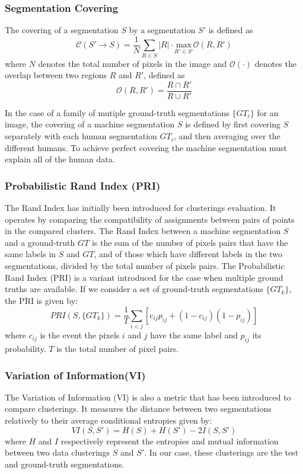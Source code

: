 \subsubsection{Segmentation Covering}

The covering of a segmentation $S$ by a segmentation $S'$ is defined as 
\begin{equation}
	\mathcal{C}(S' \rightarrow S) = \frac{1}{N}\sum_{R \in S} |R| \cdot \underset{R' \in S'}{\mathrm{max}} \mathcal{O}(R, R')
\end{equation}
where $N$ denotes the total number of pixels in the image and $\mathcal{O}(\cdot)$ denotes the overlap between two regions $R$ and $R'$, defined as
\begin{equation}
	\mathcal{O}(R, R') = \frac{R \cap R'}{R \cup R'}
\end{equation}

In the case of a family of mutiple ground-truth segmentations $\{GT_i\}$ for an image, the covering of a machine segmentation $S$ is defined by first covering $S$ separately with each human segmentation $GT_i$, and then averaging over the different humans. To achieve perfect covering the machine segmentation must explain all of the human data. 

\subsubsection{Probabilistic Rand Index (PRI)}
The Rand Index has initially been introduced for clusterings evaluation. It operates by comparing the compatibility of assignments between pairs of points in the compared clusters. The Rand Index between a machine segmentation $S$ and a ground-truth $GT$ is the sum of the number of pixels pairs that have the same labels in $S$ and $GT$, and of those which have different labels in the two segmentations, divided by the total number of pixels pairs. The Probabilistic Rand Index (PRI) is a variant introduced for the case when multiple ground truths are available. If we consider a set of ground-truth segmentations $\{GT_k\}$, the PRI is given by:
\begin{equation}
	PRI(S, \{GT_k\}) = \frac{1}{T}\sum_{i<j} [c_{ij}p_{ij} + (1-c_{ij})(1-p_{ij})]
\end{equation}
where $c_{ij}$ is the event the pixels $i$ and $j$ have the same label and $p_{ij}$ its probability. $T$ is the total number of pixel pairs.

\subsubsection{Variation of Information(VI)}
The Variation of Information (VI) is also a metric that has been introduced to compare clusterings. It measures the distance between two segmentations relatively to their average conditional entropies given by:
\begin{equation}
	VI(S, S') = H(S) + H(S') - 2I(S, S')
\end{equation}
where $H$ and $I$ respectively represent the entropies and mutual information between two data clusterings $S$ and $S'$. In our case, these clusterings are the test and ground-truth segmentations.


